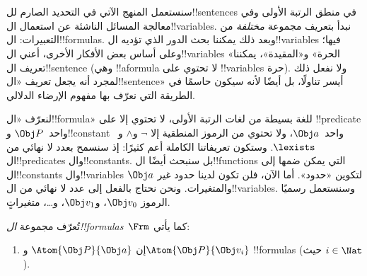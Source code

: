 \documentclass[../../../include/open-logic-section]{subfiles}
\begin{document}

\section{}

سنستعمل المنهج الآتي في التحديد الصارم لل!!{sentence}s في منطق الرتبة
الأولى وفي معالجة المسائل الناشئة عن استعمال ال!!{variable}s. نبدأ
بتعريف مجموعة \emph{مختلفة} من التعبيرات: ال!!{formula}s. وبعد ذلك
يمكننا بحث الدور الذي تؤديه ال!!{variable}s فيها؛ وعلى أساس بعض
الأفكار الأخرى، أعني ال!!{variable}s «الحرة» و«المقيدة»، يمكننا تعريف
ال!!{sentence} (وهي !!a{formula} لا تحتوي على !!{variable}s حرة).
ولا نفعل ذلك لمجرد أنه يجعل تعريف «ال!!{sentence}» أيسر تناولًا، بل
أيضًا لأنه سيكون حاسمًا في الطريقة التي نعرّف بها مفهوم الإرضاء
الدلالي.

لنعرّف «ال!!{formula}» للغة بسيطة من لغات الرتبة الأولى، لا تحتوي إلا
على !!{predicate} واحد~$\Obj P$ و!!{constant} واحد~$\Obj a$، ولا
تحتوي من الرموز المنطقية إلا $\lnot$ و$\land$ و~$\lexists$. وستكون
تعريفاتنا الكاملة أعم كثيرًا: إذ سنسمح بعدد لا نهائي من
ال!!{predicate}s وال!!{constant}s. بل سنبحث أيضًا ال!!{function}s
التي يمكن ضمها إلى ال!!{constant}s وال!!{variable}s لتكوين «حدود».
أما الآن، فلن تكون لدينا حدود غير $\Obj a$ والمتغيرات. ونحن نحتاج
بالفعل إلى عدد لا نهائي من ال!!{variable}s. وسنستعمل رسميًا الرموز
$\Obj v_0$، و$\Obj v_1$، و\dots، متغيراتٍ.

\begin{defn}
تُعرّف مجموعة \emph{ال!!{formula}s}~$\Frm$ كما يأتي:
\begin{enumerate}
\item{} إن $\Atom{\Obj P}{\Obj a}$ و$\Atom{\Obj
  P}{\Obj v_i}$ !!{formula}s (حيث $i \in \Nat$).




\end{enumerate}
\end{defn}
\end{document}

